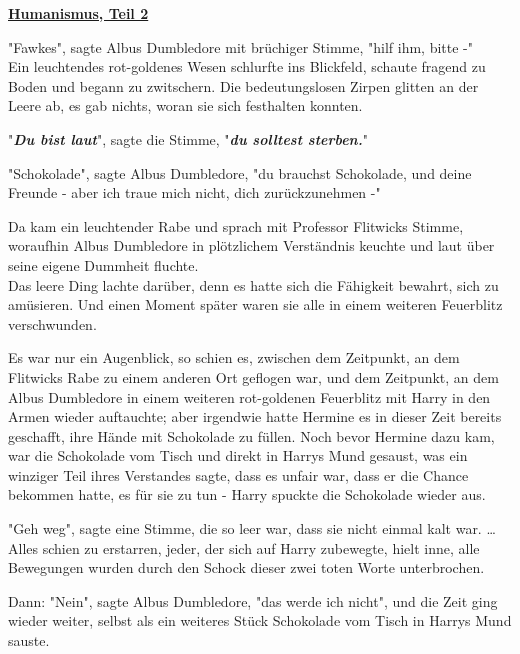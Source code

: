 

\hypertarget{humanismus-teil-2}{%

\textbf{\uline{Humanismus, Teil 2}}

"Fawkes", sagte Albus Dumbledore mit brüchiger Stimme, "hilf ihm, bitte -"\\ Ein leuchtendes rot-goldenes Wesen schlurfte ins Blickfeld, schaute fragend zu Boden und begann zu zwitschern. Die bedeutungslosen Zirpen glitten an der Leere ab, es gab nichts, woran sie sich festhalten konnten.

"\textbf{\emph{Du bist laut}}", sagte die Stimme, "\textbf{\emph{du solltest sterben.}}"

"Schokolade", sagte Albus Dumbledore, "du brauchst Schokolade, und deine Freunde - aber ich traue mich nicht, dich zurückzunehmen -"

Da kam ein leuchtender Rabe und sprach mit Professor Flitwicks Stimme, woraufhin Albus Dumbledore in plötzlichem Verständnis keuchte und laut über seine eigene Dummheit fluchte.\\ Das leere Ding lachte darüber, denn es hatte sich die Fähigkeit bewahrt, sich zu amüsieren. Und einen Moment später waren sie alle in einem weiteren Feuerblitz verschwunden.

Es war nur ein Augenblick, so schien es, zwischen dem Zeitpunkt, an dem Flitwicks Rabe zu einem anderen Ort geflogen war, und dem Zeitpunkt, an dem Albus Dumbledore in einem weiteren rot-goldenen Feuerblitz mit Harry in den Armen wieder auftauchte; aber irgendwie hatte Hermine es in dieser Zeit bereits geschafft, ihre Hände mit Schokolade zu füllen. Noch bevor Hermine dazu kam, war die Schokolade vom Tisch und direkt in Harrys Mund gesaust, was ein winziger Teil ihres Verstandes sagte, dass es unfair war, dass er die Chance bekommen hatte, es für sie zu tun - Harry spuckte die Schokolade wieder aus.

"Geh weg", sagte eine Stimme, die so leer war, dass sie nicht einmal kalt war. … Alles schien zu erstarren, jeder, der sich auf Harry zubewegte, hielt inne, alle Bewegungen wurden durch den Schock dieser zwei toten Worte unterbrochen.

Dann: "Nein", sagte Albus Dumbledore, "das werde ich nicht", und die Zeit ging wieder weiter, selbst als ein weiteres Stück Schokolade vom Tisch in Harrys Mund sauste.

}
